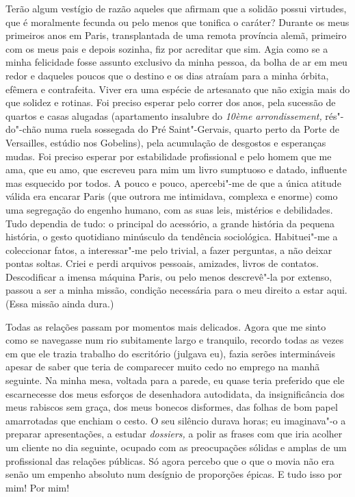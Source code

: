 Terão algum vestígio de razão aqueles que afirmam que a solidão possui
virtudes, que é moralmente fecunda ou pelo menos que tonifica o
caráter? Durante os meus primeiros anos em Paris, transplantada de uma
remota província alemã, primeiro com os meus pais e depois sozinha, fiz
por acreditar que sim. Agia como se a minha felicidade fosse assunto
exclusivo da minha pessoa, da bolha de ar em meu redor e daqueles
poucos que o destino e os dias atraíam para a minha órbita, efêmera e
contrafeita. Viver era uma espécie de artesanato que não exigia mais do
que solidez e rotinas. Foi preciso esperar pelo correr dos anos, pela
sucessão de quartos e casas alugadas (apartamento insalubre do
\emph{10ème arrondissement, }rés"-do"-chão
numa ruela sossegada do Pré Saint"-Gervais, quarto perto da Porte de
Versailles, estúdio nos Gobelins), pela acumulação de desgostos e
esperanças mudas. Foi preciso esperar por estabilidade profissional e
pelo homem que me ama, que eu amo, que escreveu para mim um livro
sumptuoso e datado, influente mas esquecido por todos. A pouco e pouco,
apercebi"-me de que a única atitude válida era encarar Paris (que outrora me
intimidava, complexa e enorme) como uma segregação do engenho humano,
com as suas leis, mistérios e debilidades. Tudo dependia de tudo: o
principal do acessório, a grande história da pequena história, o gesto
quotidiano minúsculo da tendência sociológica. Habituei"-me a coleccionar
fatos, a interessar"-me pelo trivial, a fazer perguntas, a não deixar
pontas soltas. Criei e perdi arquivos pessoais, amizades, livros de
contatos. Descodificar a imensa máquina Paris, ou pelo menos
descrevê"-la por extenso, passou a ser a minha missão, condição
necessária para o meu direito a estar aqui. (Essa missão ainda dura.)

Todas as relações passam por momentos mais delicados. Agora que me sinto
como se navegasse num rio subitamente largo e tranquilo, recordo todas
as vezes em que ele trazia trabalho do escritório (julgava eu), fazia
serões intermináveis apesar de saber que teria de comparecer muito cedo
no emprego na manhã seguinte. Na minha mesa, voltada para a parede, eu
quase teria preferido que ele escarnecesse dos meus esforços de
desenhadora autodidata, da insignificância dos meus rabiscos sem graça,
dos meus bonecos disformes, das folhas de bom papel amarrotadas que
enchiam o cesto. O seu silêncio durava horas; eu imaginava"-o a
preparar apresentações, a estudar \emph{dossiers, }a polir as frases com
que iria acolher um cliente no dia seguinte, ocupado com as preocupações
sólidas e amplas
de um profissional das relações públicas. Só agora percebo que o que o
movia não era senão um empenho absoluto num desígnio de proporções
épicas. E tudo isso por mim! Por mim!

